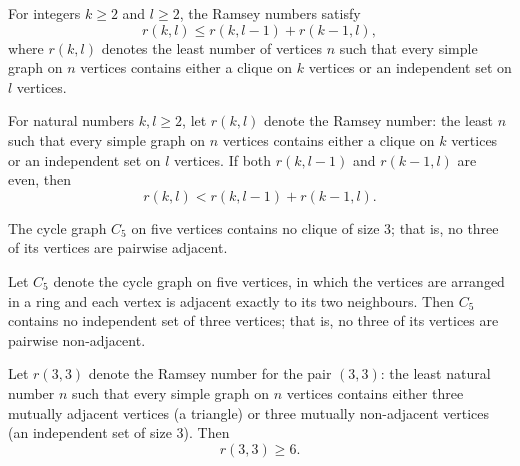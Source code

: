 \begin{theorem}
\label{SimpleGraph.ramsey_recursion}
For integers $k \ge 2$ and $l \ge 2$, the Ramsey numbers satisfy
\[
r(k, l) \le r(k, l-1) + r(k-1, l),
\]
where $r(k, l)$ denotes the least number of vertices $n$ such that every simple graph on
$n$ vertices contains either a clique on $k$ vertices or an independent set on $l$
vertices.
\end{theorem}

\begin{theorem}
\label{SimpleGraph.ramsey_recursion_strict}
For natural numbers $k, l \ge 2$, let $r(k, l)$ denote the Ramsey number: the least $n$
such that every simple graph on $n$ vertices contains either a clique on $k$ vertices or
an independent set on $l$ vertices. If both $r(k, l-1)$ and $r(k-1, l)$ are even, then
\[
r(k, l) < r(k, l-1) + r(k-1, l).
\]
\end{theorem}

\begin{theorem}
\label{SimpleGraph.cycleGraph_five_cliqueFree_three}
The cycle graph $C_5$ on five vertices contains no clique of size $3$; that is, no three
of its vertices are pairwise adjacent.
\end{theorem}

\begin{theorem}
\label{SimpleGraph.cycleGraph_five_indepSetFree_three}
Let $C_5$ denote the cycle graph on five vertices, in which the vertices are arranged in
a ring and each vertex is adjacent exactly to its two neighbours. Then $C_5$ contains no
independent set of three vertices; that is, no three of its vertices are pairwise
non-adjacent.
\end{theorem}

\begin{theorem}
\label{SimpleGraph.six_le_ramseyNumber_three_three}
Let $r(3,3)$ denote the Ramsey number for the pair $(3,3)$: the least natural number $n$
such that every simple graph on $n$ vertices contains either three mutually adjacent
vertices (a triangle) or three mutually non-adjacent vertices (an independent set of
size $3$). Then
\[
r(3,3) \ge 6.
\]
\end{theorem}

